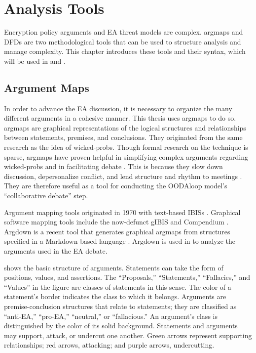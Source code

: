 \chapter{Analysis Tools}
\label{chap-tools}

Encryption policy arguments and \acl{EA} threat models are complex. \Acp{argmap} and \aclp{DFD} are two methodological
tools that can be used to structure analysis and manage complexity. This chapter introduces these tools and their
syntax, which will be used in  and .


\section{Argument Maps}
\label{sec-arg-maps-intro}

In order to advance the \ac{EA} discussion, it is necessary to organize the many different arguments in a cohesive
manner. This thesis uses \acp{argmap} to do so. \Acp{argmap} are graphical representations of the logical structures and
relationships between statements, premises, and conclusions. They originated from the same research as the idea of
\acp{wicked-prob}. Though formal research on the technique is sparse, \acp{argmap} have proven helpful in simplifying
complex arguments regarding \acp{wicked-prob} and in facilitating debate \cite{renton_2007}. This is because they slow
down discussion, depersonalize conflict, and lend structure and rhythm to meetings \cite{dutoit_hypermedia_2006}. They
are therefore useful as a tool for conducting the \ac{OODAloop} model's ``collaborative debate'' step.

Argument mapping tools originated in 1970 with text-based \acp{IBIS} \cite{kunz_issues_1970}. Graphical software mapping
tools include the now-defunct gIBIS \cite{conklin_gibis_1988} and Compendium \cite{dutoit_hypermedia_2006}. Argdown is a
recent tool that generates graphical \acp{argmap} from structures specified in a Markdown-based language
\cite{voigt_argdown_2018}. Argdown is used in  to analyze the arguments used in the \ac{EA}
debate.

 shows the basic structure of arguments. Statements can take the form of positions, values, and
assertions. The ``Proposals,'' ``Statements,'' ``Fallacies,'' and ``Values'' in the figure are classes of statements in
this sense. The color of a statement's border indicates the class to which it belongs. Arguments are premise-conclusion
structures that relate to statements; they are classified as ``anti-EA,'' ``pro-EA,'' ``neutral,'' or ``fallacious.'' An
argument's class is distinguished by the color of its solid background. Statements and arguments may support, attack, or
undercut one another. Green arrows represent supporting relationships; red arrows, attacking; and purple arrows,
undercutting.

